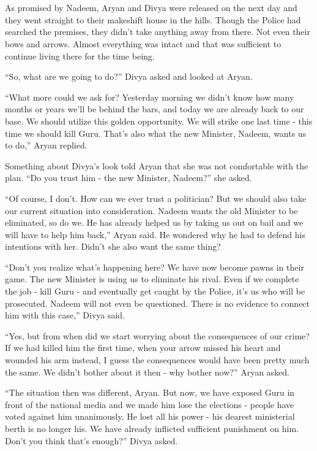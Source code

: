 \chapter{}

As promised by Nadeem, Aryan and Divya were released on the next day and they
went straight to their makeshift house in the hills. Though the Police had
searched the premises, they didn't take anything away from there. Not even their
bows and arrows. Almost everything was intact and that was sufficient to
continue living there for the time being.

“So, what are we going to do?” Divya asked and looked at Aryan.

“What more could we ask for? Yesterday morning we didn't know how many months or
years we'll be behind the bars, and today we are already back to our base. We
should utilize this golden opportunity. We will strike one last time - this time
we should kill Guru. That's also what the new Minister, Nadeem, wants us to do,”
Aryan replied.

Something about Divya's look told Aryan that she was not comfortable with the
plan. “Do you trust him - the new Minister, Nadeem?” she asked.

“Of course, I don't. How can we ever trust a politician? But we should also take
our current situation into consideration. Nadeem wants the old Minister to be
eliminated, so do we. He has already helped us by taking us out on bail and we
will have to help him back,” Aryan said. He wondered why he had to defend his
intentions with her. Didn't she also want the same thing?

“Don't you realize what's happening here? We have now become pawns in their
game. The new Minister is using us to eliminate his rival. Even if we complete
the job - kill Guru - and eventually get caught by the Police, it's us who will
be prosecuted. Nadeem will not even be questioned. There is no evidence to
connect him with this case,” Divya said.

“Yes, but from when did we start worrying about the consequences of our crime?
If we had killed him the first time, when your arrow missed his heart and
wounded his arm instead, I guess the consequences would have been pretty much
the same. We didn't bother about it then - why bother now?” Aryan asked.

“The situation then was different, Aryan. But now, we have exposed Guru in front
of the national media and we made him lose the elections - people have voted
against him unanimously. He lost all his power - his dearest ministerial berth
is no longer his. We have already inflicted sufficient punishment on him. Don't
you think that's enough?” Divya asked.

